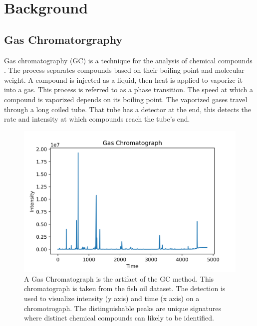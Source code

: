 \documentclass[runningheads]{llncs}
\begin{document}
\section{Background}
\label{background}

\subsection{Gas Chromatorgraphy}

Gas chromatography (GC) is a technique for the analysis of chemical compounds \cite{eder1995gas,restek2018high}.
The process separates compounds based on their boiling point and molecular weight.
A compound is injected as a liquid, then heat is applied to vaporize it into a gas. 
This process is referred to as a phase transition. 
The speed at which a compound is vaporized depends on its boiling point. 
The vaporized gases travel through a long coiled tube.
That tube has a detector at the end, this detects the rate and intensity at which compounds reach the tube's end. 


\begin{figure}[htb]
  \centering
  \includegraphics[width=12.5cm]{chromatograph.png}
  \caption{
    A Gas Chromatograph is the artifact of the GC method.
    This chromatograph is taken from the fish oil dataset.
    The detection is used to visualize intensity (y axis) and time (x axis) on a chromotrogaph. 
    The distinguishable peaks are unique signatures where distinct chemical compounds can likely to be identified.}
  \label{fig:gas-chromatography} 
  \captionsetup[figure]{font=small,labelfont=small}
\end{figure}
\end{document}
